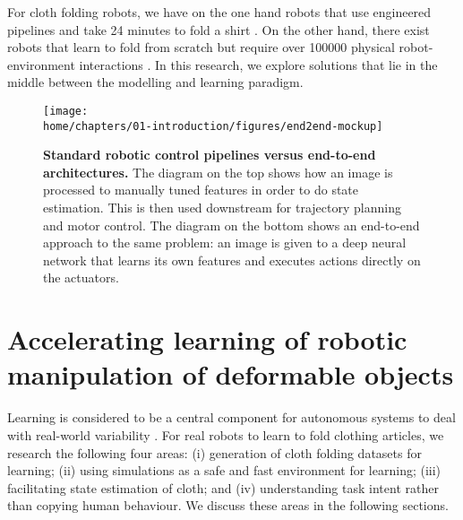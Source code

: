 \documentclass[\home/main.tex]{subfiles}
\begin{document}
For cloth folding robots, we have on the one hand robots that use engineered pipelines and take 24 minutes to fold a shirt \autocite{Maitin2010}. On the other hand, there exist robots that learn to fold from scratch but require over \qty{100000}{} physical robot-environment interactions \autocite{Matas2018}. In this research, we explore solutions that lie in the middle between the modelling and learning paradigm.



\begin{figure}[htpb]
    \texttt{[image: \\home/chapters/01-introduction/figures/end2end-mockup]}
    \caption{\textbf{Standard robotic control pipelines versus end-to-end architectures.} The diagram on the top shows how an image is processed to manually tuned features in order to do state estimation. This is then used downstream for trajectory planning and motor control. The diagram on the bottom shows an end-to-end approach to the same problem: an image is given to a deep neural network that learns its own features and executes actions directly on the actuators.}
    \label{fig:intro_end2end}
\end{figure}

\section{Accelerating learning of robotic manipulation of deformable objects}
Learning is considered to be a central component for autonomous systems to deal with real-world variability \autocite{kroemer2021review}. For real robots to learn to fold clothing articles, we research the following four areas:
(i) generation of cloth folding datasets for learning;
(ii) using simulations as a safe and fast environment for learning;
(iii) facilitating state estimation of cloth; and
(iv) understanding task intent rather than copying human behaviour.
We discuss these areas in the following sections.
\end{document}

